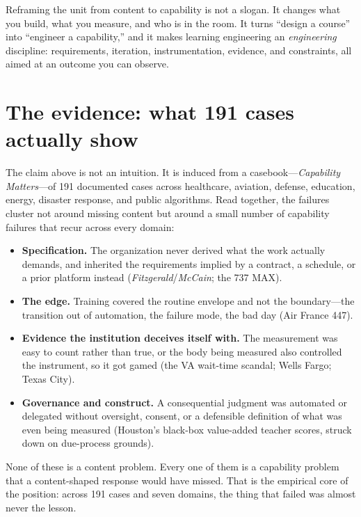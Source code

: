 \documentclass[11pt]{article}
\begin{document}
Reframing the unit from content to capability is not a slogan. It changes what you build, what you measure, and who is in the room. It turns ``design a course'' into ``engineer a capability,'' and it makes learning engineering an \emph{engineering} discipline: requirements, iteration, instrumentation, evidence, and constraints, all aimed at an outcome you can observe.

\section{The evidence: what 191 cases actually show}

The claim above is not an intuition. It is induced from a casebook---\emph{Capability Matters}---of 191 documented cases across healthcare, aviation, defense, education, energy, disaster response, and public algorithms. Read together, the failures cluster not around missing content but around a small number of capability failures that recur across every domain:

\begin{itemize}[leftmargin=1.2em,itemsep=3pt,topsep=3pt]
  \item \textbf{Specification.} The organization never derived what the work actually demands, and inherited the requirements implied by a contract, a schedule, or a prior platform instead (\emph{Fitzgerald}/\emph{McCain}; the 737 MAX).
  \item \textbf{The edge.} Training covered the routine envelope and not the boundary---the transition out of automation, the failure mode, the bad day (Air France 447).
  \item \textbf{Evidence the institution deceives itself with.} The measurement was easy to count rather than true, or the body being measured also controlled the instrument, so it got gamed (the VA wait-time scandal; Wells Fargo; Texas City).
  \item \textbf{Governance and construct.} A consequential judgment was automated or delegated without oversight, consent, or a defensible definition of what was even being measured (Houston's black-box value-added teacher scores, struck down on due-process grounds).
\end{itemize}

None of these is a content problem. Every one of them is a capability problem that a content-shaped response would have missed. That is the empirical core of the position: across 191 cases and seven domains, the thing that failed was almost never the lesson.
\end{document}
